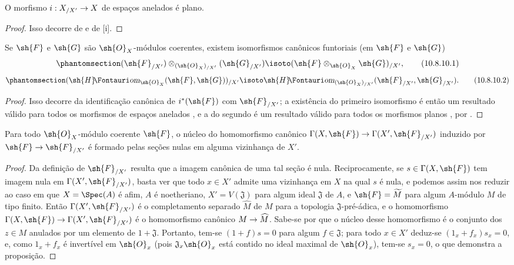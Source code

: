\documentclass[oneside]{amsart}
\makeatletter
\newcommand{\ega@arrow}[2]{\mathchoice{#1}{#2}{#2}{#2}}
\renewcommand{\to}{\ega@arrow{\longrightarrow}{\rightarrow}}
\newcommand*{\ega@sheafop}[3]{\sh{#1}#2\textup{\kern-2.2pt{\Fontauri\slshape #3}}}
\newcommand*{\shHom}{\ega@sheafop{H}{}{om}}
\let\EGAOriginalLabel\label
\renewcommand{\label}[1]{\phantomsection\EGAOriginalLabel{#1}}
\makeatother
\begin{document}
\begin{corollary}[10.8.9]
\label{I.10.8.9}
O morfismo $i:X_{/X'}\to X$ de espaços anelados é plano.
\end{corollary}

\begin{proof}
Isso decorre de  e de [i].
\end{proof}

\begin{corollary}[10.8.10]
\label{I.10.8.10}
Se $\sh{F}$ e $\sh{G}$ são $\sh{O}_X$-módulos coerentes, existem isomorfismos canônicos funtoriais (em $\sh{F}$ e $\sh{G}$)
\[
\label{I.10.8.10.1}
  (\sh{F}_{/X'})\otimes_{(\sh{O}_X)_{/X'}}(\sh{G}_{/X'})\isoto(\sh{F}\otimes_{\sh{O}_X}\sh{G})_{/X'},
  \tag{10.8.10.1}
\]
\[
\label{I.10.8.10.2}
  (\shHom_{\sh{O}_X}(\sh{F},\sh{G}))_{/X'}\isoto\shHom_{(\sh{O}_X)_{/X'}}(\sh{F}_{/X'},\sh{G}_{/X'}).
  \tag{10.8.10.2}
\]
\end{corollary}

\begin{proof}
Isso decorre da identificação canônica de $i^*(\sh{F})$ com $\sh{F}_{/X'}$; a existência do primeiro isomorfismo é então um resultado válido para todos os morfismos de espaços anelados , e a do segundo é um resultado válido para todos os morfismos planos , por .
\end{proof}

\begin{proposition}[10.8.11]
\label{I.10.8.11}
Para todo $\sh{O}_X$-módulo coerente $\sh{F}$, o núcleo do homomorfismo canônico $\Gamma(X,\sh{F})\to\Gamma(X',\sh{F}_{/X'})$ induzido por $\sh{F}\to\sh{F}_{/X'}$ é formado pelas seções nulas em alguma vizinhança de $X'$.
\end{proposition}

\begin{proof}
Da definição de $\sh{F}_{/X'}$ resulta que a imagem canônica de uma tal seção é nula.
Reciprocamente, se $s\in\Gamma(X,\sh{F})$ tem imagem nula em $\Gamma(X',\sh{F}_{/X'})$, basta ver que todo $x\in X'$ admite uma vizinhança em $X$ na qual $s$ é nula, e podemos assim nos reduzir ao caso em que $X=\Spec(A)$ é afim, $A$ é noetheriano, $X'=V(\mathfrak{J})$ para algum ideal $\mathfrak{J}$ de $A$, e $\sh{F}=\widetilde{M}$ para algum $A$-módulo $M$ de tipo finito.
Então $\Gamma(X',\sh{F}_{/X'})$ é o completamento separado $\widehat{M}$ de $M$ para a topologia $\mathfrak{J}$-pré-ádica, e o homomorfismo $\Gamma(X,\sh{F})\to\Gamma(X',\sh{F}_{/X'})$ é o homomorfismo canônico $M\to\widehat{M}$.
Sabe-se por  que o núcleo desse homomorfismo é o conjunto dos $z\in M$ anulados por um elemento de $1+\mathfrak{J}$.
Portanto, tem-se $(1+f)s=0$ para algum $f\in\mathfrak{J}$; para todo $x\in X'$ deduz-se $(1_x+f_x)s_x=0$, e, como $1_x+f_x$ é invertível em $\sh{O}_x$ (pois $\mathfrak{J}_x\sh{O}_x$ está contido no ideal maximal de $\sh{O}_x$), tem-se $s_x=0$, o que demonstra a proposição.
\end{proof}
\end{document}
